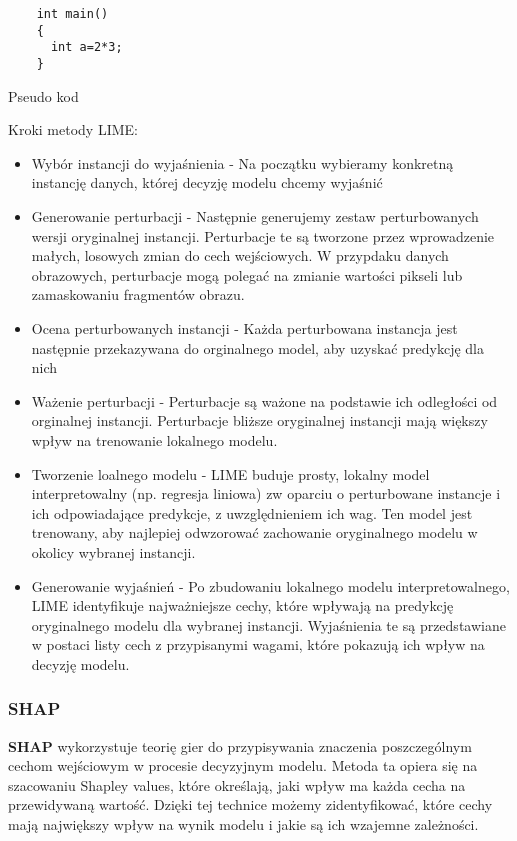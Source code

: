 \begin{listing}
  \begin{verbatim}
    int main()
    {
      int a=2*3;
    }
  \end{verbatim}
  \caption{Pseudo kod} \label{listing:lime}
\end{listing}

Kroki metody LIME:
\begin{itemize}
	\item Wybór instancji do wyjaśnienia - Na początku wybieramy konkretną instancję danych, której decyzję modelu chcemy wyjaśnić
	\item Generowanie perturbacji - Następnie generujemy zestaw perturbowanych wersji oryginalnej instancji.
	      Perturbacje te są tworzone przez wprowadzenie małych, losowych zmian do cech wejściowych.
	      W przypdaku danych obrazowych, perturbacje mogą polegać na zmianie wartości pikseli lub zamaskowaniu fragmentów obrazu.
	\item Ocena perturbowanych instancji - Każda perturbowana instancja jest następnie przekazywana do orginalnego model, aby uzyskać predykcję dla nich
	\item Ważenie perturbacji - Perturbacje są ważone na podstawie ich odległości od orginalnej instancji.
	      Perturbacje bliższe oryginalnej instancji mają większy wpływ na trenowanie lokalnego modelu.
	\item Tworzenie loalnego modelu - LIME buduje prosty, lokalny model interpretowalny (np. regresja liniowa) zw oparciu o perturbowane instancje i ich odpowiadające predykcje, z uwzględnieniem ich wag.
	      Ten model jest trenowany, aby najlepiej odwzorować zachowanie oryginalnego modelu w okolicy wybranej instancji.
	\item Generowanie wyjaśnień - Po zbudowaniu lokalnego modelu interpretowalnego, LIME identyfikuje najważniejsze cechy, które wpływają na predykcję oryginalnego modelu dla wybranej instancji.
	      Wyjaśnienia te są przedstawiane w postaci listy cech z przypisanymi wagami, które pokazują ich wpływ na decyzję modelu.
\end{itemize}

\subsubsection*{SHAP}
\textbf{SHAP} wykorzystuje teorię gier do przypisywania znaczenia poszczególnym cechom wejściowym w procesie decyzyjnym modelu.
Metoda ta opiera się na szacowaniu Shapley values, które określają, jaki wpływ ma każda cecha na przewidywaną wartość.
Dzięki tej technice możemy zidentyfikować, które cechy mają największy wpływ na wynik modelu i jakie są ich wzajemne zależności.

